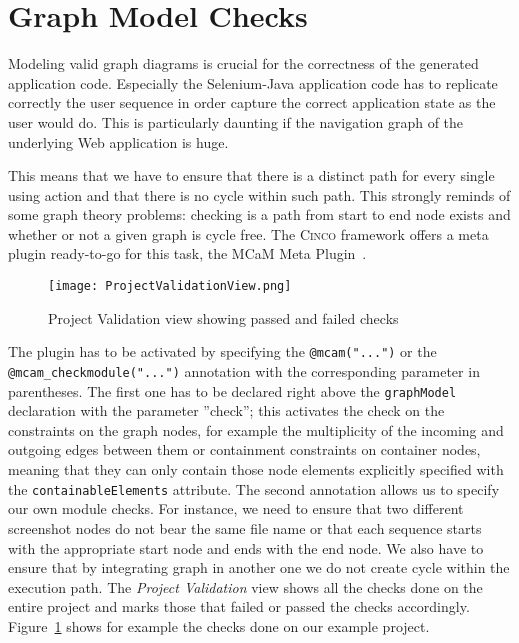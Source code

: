 \section{Graph Model Checks}\label{sec:modCheck}

Modeling valid graph diagrams is crucial for the correctness of the generated application code. Especially the Selenium-Java application code has to replicate correctly the user sequence in order capture the correct application state as the user would do. This is particularly daunting if the navigation graph of the underlying Web application is huge.

This means that we have to ensure that there is a distinct path for every single using action and that there is no cycle within such path. This strongly reminds of some graph theory problems: checking is a path from start to end node exists and whether or not a given graph is cycle free. The \textsc{Cinco} framework offers a meta plugin ready-to-go for this task, the MCaM Meta Plugin~\cite{gitlabcinco}.

\begin{figure}[h]
    \centering
    \texttt{[image: ProjectValidationView.png]}
    \caption{Project Validation view showing passed and failed checks}
    \label{fig:modelChecks}
\end{figure}

The plugin has to be activated by specifying the \lstinline{@mcam("...")} or the \lstinline{@mcam_checkmodule("...")} annotation with the corresponding parameter in parentheses. The first one has to be declared right above the \lstinline[language=MGL]{graphModel} declaration with the parameter ''check''; this activates the check on the constraints on the graph nodes, for example the multiplicity of the incoming and outgoing edges between them or containment constraints on container nodes, meaning that they can only contain those node elements explicitly specified with the \lstinline[language=MGL]{containableElements} attribute. The second annotation allows us to specify our own module checks. For instance, we need to ensure that two different screenshot nodes do not bear the same file name or that each sequence starts with the appropriate start node and ends with the end node. We also have to ensure that by integrating graph in another one we do not create cycle within the execution path. The \textit{Project Validation} view shows all the checks done on the entire project and marks those that failed or passed the checks accordingly. Figure~\ref{fig:modelChecks} shows for example the checks done on our example project.

